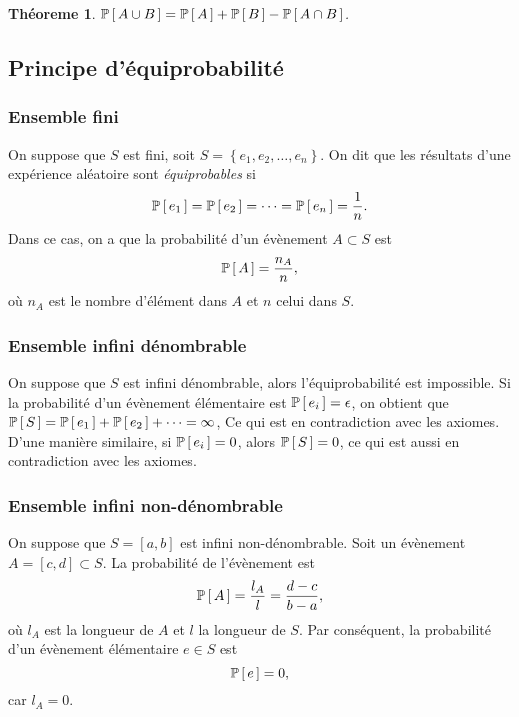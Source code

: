 \documentclass[11pt]{article}
\renewcommand\P[1]{%
	\ensuremath{%
		\mathbb{P}\left[\,#1\,\right]%
	}%
}%
\newtheorem{theoreme}{Théoreme}[section]
\begin{document}
\begin{theoreme}
	$\P{A\cup B}=\P{A}+\P{B}-\P{A\cap B}$.
\end{theoreme}

\subsection{Principe d'équiprobabilité}
\subsubsection{Ensemble fini}
On suppose que $S$ est fini, soit $S=\left\{e_1,e_2,\dots,e_n\right\}$. On dit
que les résultats d'une expérience aléatoire sont \textit{équiprobables} si
\begin{equation*}
	\P{e_1}=\P{e_2}=\cdots=\P{e_n}=\frac{1}{n}.
\end{equation*}
Dans ce cas, on a que la probabilité d'un évènement $A\subset S$ est
\begin{equation*}
	\P{A}=\frac{n_A}{n},
\end{equation*}
où $n_A$ est le nombre d'élément dans $A$ et $n$ celui dans $S$.

\subsubsection{Ensemble infini dénombrable}
On suppose que $S$ est infini dénombrable, alors l'équiprobabilité est
impossible. Si la probabilité d'un évènement élémentaire est $\P{e_i}=\epsilon$,
on obtient que $\P{S}=\P{e_1}+\P{e_2}+\cdots=\infty$, Ce qui est en contradiction
avec les axiomes. D'une manière similaire, si $\P{e_i}=0$, alors $\P{S}=0$, ce
qui est aussi en contradiction avec les axiomes.

\subsubsection{Ensemble infini non-dénombrable}
On suppose que $S=[a,b]$ est infini non-dénombrable. Soit un évènement
$A=[c,d]\subset S$. La probabilité de l'évènement est
\begin{equation*}
	\P{A}=\frac{l_A}{l}=\frac{d-c}{b-a},
\end{equation*}
où $l_A$ est la longueur de $A$ et $l$ la longueur de $S$. Par conséquent, la
probabilité d'un évènement élémentaire $e\in S$ est
\begin{equation*}
	\P{e}=0,
\end{equation*}
car $l_A=0$.
\end{document}
